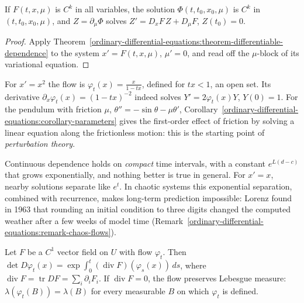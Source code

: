 \begin{corollary}[Parameters]\label{ordinary-differential-equations:corollary-parameters}
If $F(t, x, \mu)$ is $C^k$ in all variables, the solution $\Phi(t, t_0, x_0, \mu)$ is $C^k$ in $(t, t_0, x_0, \mu)$, and $Z = \partial_\mu\Phi$ solves $Z' = D_xF\,Z + D_\mu F$, $Z(t_0) = 0$.
\end{corollary}

\begin{proof}
Apply Theorem~\ref{ordinary-differential-equations:theorem-differentiable-dependence} to the system $x' = F(t, x, \mu)$, $\mu' = 0$, and read off the $\mu$-block of its variational equation.
\end{proof}

\begin{example}\label{ordinary-differential-equations:example-variational}
For $x' = x^2$ the flow is $\varphi_t(x) = \frac{x}{1 - tx}$, defined for $tx < 1$, an open set. Its derivative $\partial_x\varphi_t(x) = (1 - tx)^{-2}$ indeed solves $Y' = 2\varphi_t(x)Y$, $Y(0) = 1$. For the pendulum with
friction $\mu$, $\theta'' = -\sin\theta - \mu\theta'$, Corollary~\ref{ordinary-differential-equations:corollary-parameters} gives the first-order effect of friction by solving a linear equation along the frictionless motion: this
is the starting point of \emph{perturbation theory}.
\end{example}

\begin{counterexample}\label{ordinary-differential-equations:counterexample-sensitivity}
Continuous dependence holds on \emph{compact} time intervals, with a constant $e^{L(d - c)}$ that grows exponentially, and nothing better is true in general. For $x' = x$, nearby solutions separate like $e^t$. In chaotic systems this
exponential separation, combined with recurrence, makes long-term prediction impossible: Lorenz found in 1963 that rounding an initial condition to three digits changed the computed weather after a few weeks of model time
(Remark~\ref{ordinary-differential-equations:remark-chaos-flows}).
\end{counterexample}

\begin{theorem}\label{ordinary-differential-equations:theorem-liouville}
Let $F$ be a $C^1$ vector field on $U$ with flow $\varphi_t$. Then $\det D\varphi_t(x) = \exp\int_0^t(\operatorname{div}F)(\varphi_s(x))\,ds$, where $\operatorname{div}F = \operatorname{tr}DF = \sum_i\partial_iF_i$. If
$\operatorname{div}F = 0$, the flow preserves Lebesgue measure: $\lambda(\varphi_t(B)) = \lambda(B)$ for every measurable $B$ on which $\varphi_t$ is defined.
\end{theorem}

